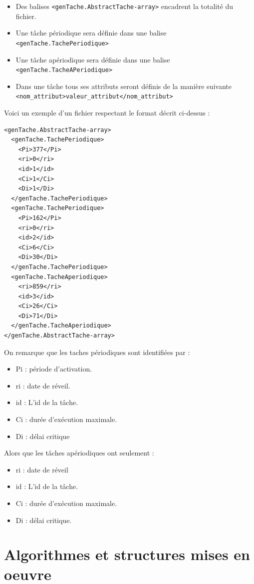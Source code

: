 \begin{itemize}
\item
Des balises \verb+<genTache.AbstractTache-array>+ encadrent la totalité du fichier.
\item
Une tâche périodique sera définie dans une balise  \verb+<genTache.TachePeriodique>+ 
\item
Une tâche apériodique sera définie dans une balise  \verb+<genTache.TacheAPeriodique>+ 
\item
Dans une tâche tous ses attributs seront définis de la manière suivante \verb+<nom_attribut>valeur_attribut</nom_attribut>+
\end{itemize}

Voici un exemple d'un fichier respectant le format décrit ci-dessus : 

\begin{lstlisting}
<genTache.AbstractTache-array>
  <genTache.TachePeriodique>
    <Pi>377</Pi>
    <ri>0</ri>
    <id>1</id>
    <Ci>1</Ci>
    <Di>1</Di>
  </genTache.TachePeriodique>
  <genTache.TachePeriodique>
    <Pi>162</Pi>
    <ri>0</ri>
    <id>2</id>
    <Ci>6</Ci>
    <Di>30</Di>
  </genTache.TachePeriodique>
  <genTache.TacheAperiodique>
    <ri>859</ri>
    <id>3</id>
    <Ci>26</Ci>
    <Di>71</Di>
  </genTache.TacheAperiodique>
</genTache.AbstractTache-array>
\end{lstlisting}
On remarque que les taches périodiques sont identifiées par : 
\begin{itemize}
\item
Pi : période d'activation.
\item
ri : date de réveil.
\item
id : L'id de la tâche.
\item
Ci : durée d'exécution maximale.
\item
Di  : délai critique
\end{itemize} 
Alors que les tâches apériodiques ont seulement : 
\begin{itemize}
\item
ri  : date de réveil
\item
id : L'id de la tâche.
\item
Ci : durée d'exécution maximale.
\item
Di : délai critique.
\end{itemize} 


\section{Algorithmes et structures mises en oeuvre}


